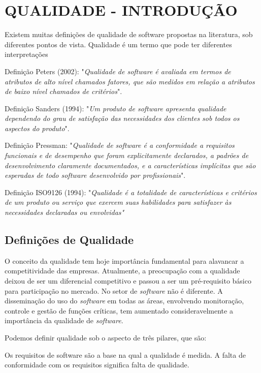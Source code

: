 
\chapter{QUALIDADE - INTRODUÇÃO}
\label{sec:qualidade}

Existem muitas definições de qualidade de software propostas na literatura, sob diferentes pontos de vista. Qualidade é um termo que pode ter diferentes interpretações

Definição Peters (2002): "\textit{Qualidade de software é avaliada em termos de atributos de alto nível chamados fatores, que são medidos em relação a atributos de baixo nível chamados de critérios}".

Definição Sanders (1994): "\textit{Um produto de software apresenta qualidade dependendo do grau de satisfação das necessidades dos clientes sob todos os aspectos do produto}".

Definição Pressman: "\textit{Qualidade de software é a conformidade a requisitos funcionais e de desempenho que foram explicitamente declarados, a padrões de desenvolvimento claramente documentados, e a características implícitas que são esperadas de todo software desenvolvido por profissionais}".

Definição ISO9126 (1994): "\textit{Qualidade é a totalidade de características e critérios de um produto ou serviço que exercem suas habilidades para satisfazer às necessidades declaradas ou envolvidas"}
\cite{univasf}
\nocite{usp}
\nocite{devmedia}


\section{Definições de Qualidade}
\label{sec:tradicional}

O conceito da qualidade tem hoje importância fundamental para alavancar a competitividade das empresas. Atualmente, a preocupação com a qualidade deixou de ser um diferencial competitivo e passou a ser um pré-requisito básico para participação no mercado. No setor de \textit{software} não é diferente. A disseminação do uso do \textit{software} em todas as áreas, envolvendo monitoração, controle e gestão de funções críticas, tem aumentado consideravelmente a importância da qualidade de \textit{software}.

Podemos definir qualidade sob o aspecto de três pilares, que são:

Os requisitos de software são a base na qual a qualidade é medida.
A falta de conformidade com os requisitos significa falta de qualidade.

